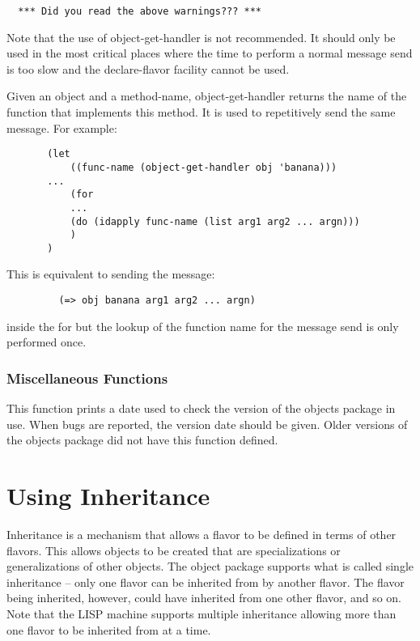 \begin{verbatim}
  *** Did you read the above warnings??? ***
\end{verbatim}

{}
    Note that the use of object-get-handler is not  recommended.
    It should only be used in the most critical places where the
    time  to  perform  a normal message send is too slow and the
    declare-flavor facility cannot be used.

    Given  an  object  and  a  method-name,   object-get-handler
    returns  the  name  of  the  function  that  implements this
    method.  It is used to repetitively send the  same  message.
    For example:\\

\begin{verbatim}
       (let
           ((func-name (object-get-handler obj 'banana)))
       ...
           (for
           ...
           (do (idapply func-name (list arg1 arg2 ... argn)))
           )
       )
\end{verbatim}
    This is equivalent to sending the message:

\begin{verbatim}
         (=> obj banana arg1 arg2 ... argn)
\end{verbatim}
    inside  the  for but the lookup of the function name for the
    message send is only performed once.

\subsubsection{Miscellaneous Functions}

{
    This function prints a date used to check the version of the
    objects package in use.  When bugs are reported, the version
    date should be given.  Older versions of the objects package
    did not have this function defined.}

\section{Using Inheritance}

  Inheritance is a mechanism that allows a flavor to be  defined
in  terms  of  other flavors.  This allows objects to be created
that are specializations or generalizations  of  other  objects.
The object package supports what is called single inheritance --
only  one  flavor  can be inherited from by another flavor.  The
flavor being inherited, however, could have inherited  from  one
other  flavor,  and  so on.  Note that the LISP machine supports
multiple  inheritance  allowing  more  than  one  flavor  to  be
inherited from at a time.\\


